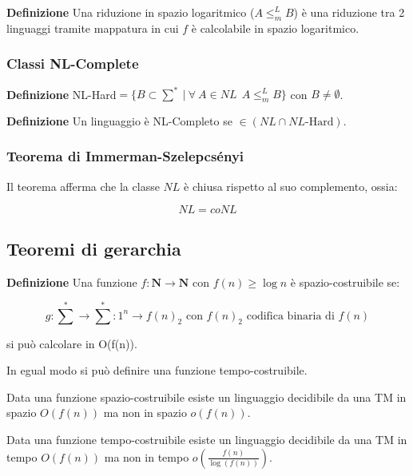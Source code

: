 \documentclass{article}
\begin{document}
\textbf{Definizione} Una riduzione in spazio logaritmico ($A\leq_m^L B$) è una riduzione tra 2 linguaggi tramite mappatura in cui $f$ è calcolabile in spazio logaritmico.\newline

\subsubsection{Classi NL-Complete}

\textbf{Definizione} NL-Hard$=\{B\subset\sum^*\ |\ \forall\ A\in NL\ \ A\leq_m^L B\}$ con $B\neq\emptyset$.\newline

\noindent\textbf{Definizione} Un linguaggio è NL-Completo se $\in(NL\cap NL\text{-Hard})$.\newline

\subsubsection{Teorema di Immerman-Szelepcsényi}

Il teorema afferma che la classe $NL$ è chiusa rispetto al suo complemento, ossia:

$$NL=coNL$$\newline

\subsection{Teoremi di gerarchia}

\textbf{Definizione} Una funzione $f:\mathbf{N}\rightarrow\mathbf{N}$ con $f(n)\geq \log n$ è spazio-costruibile se:

$$g:{\sum}^*\rightarrow{\sum}^*:1^n\rightarrow f(n)_2 \text{ con $f(n)_2$ codifica binaria di $f(n)$}$$\newline

\noindent si può calcolare in O(f(n)).\newline

\noindent In egual modo si può definire una funzione tempo-costruibile.\newline

\noindent Data una funzione spazio-costruibile esiste un linguaggio decidibile da una TM in spazio $O(f(n))$ ma non in spazio $o(f(n))$.\newline

\noindent Data una funzione tempo-costruibile esiste un linguaggio decidibile da una TM in tempo $O(f(n))$ ma non in tempo $o(\frac{f(n)}{\log(f(n))})$.\newline
\end{document}
